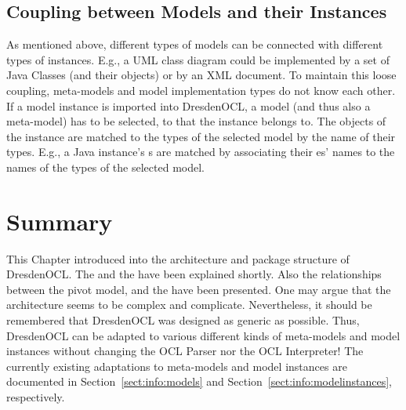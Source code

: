 \subsection{Coupling between Models and their Instances}

As mentioned above, different types of models can be connected with different 
types of instances. E.g., a \acs{UML} class diagram could be implemented by a 
set of Java Classes (and their objects) or by an \acs{XML} document. To 
maintain this loose coupling, meta-models and model implementation types do not 
know each other. If a model instance is imported into DresdenOCL, a model (and
thus also a meta-model) has to be selected, to that the instance belongs to. The
objects of the instance are matched to the types of the selected model by the 
name of their types. E.g., a Java instance's s are matched by
associating their es' names to the names of the types of the
selected model.



\section{Summary}

This Chapter introduced into the architecture and package structure of
DresdenOCL. The  and the  
have been explained shortly. Also the relationships between the pivot model, 
 and the  have
been presented. One may argue that the architecture seems to be complex and 
complicate. Nevertheless, it should be remembered that DresdenOCL was 
designed as generic as possible. Thus, DresdenOCL can be adapted to various
different kinds of meta-models and model instances without changing the
\acs{OCL} Parser nor the \acs{OCL} Interpreter! The currently existing
adaptations to meta-models and model instances are documented in
Section~\ref{sect:info:models} and Section~\ref{sect:info:modelinstances},
respectively.
